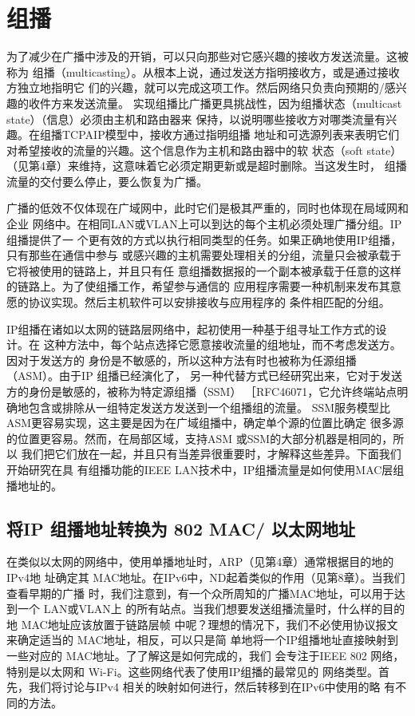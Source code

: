 \section{组播}
为了减少在广播中涉及的开销，可以只向那些对它感兴趣的接收方发送流量。这被称为
组播（multicasting）。从根本上说，通过发送方指明接收方，或是通过接收方独立地指明它
们的兴趣，就可以完成这项工作。然后网络只负责向预期的/感兴趣的收件方来发送流量。
实现组播比广播更具挑战性，因为组播状态（multicast state）（信息）必须由主机和路由器来
保持，以说明哪些接收方对哪类流量有兴趣。在组播TCPAIP模型中，接收方通过指明组播
地址和可选源列表来表明它们对希望接收的流量的兴趣。这个信息作为主机和路由器中的软
状态（soft state）（见第4章）来维持，这意味着它必须定期更新或是超时删除。当这发生时，
组播流量的交付要么停止，要么恢复为广播。

广播的低效不仅体现在广域网中，此时它们是极其严重的，同时也体现在局域网和企业
网络中。在相同LAN或VLAN上可以到达的每个主机必须处理广播分组。IP 组播提供了一
个更有效的方式以执行相同类型的任务。如果正确地使用IP组播，只有那些在通信中参与
或感兴趣的主机需要处理相关的分组，流量只会被承载于它将被使用的链路上，并且只有任
意组播数据报的一个副本被承载于任意的这样的链路上。为了使组播工作，希望参与通信的
应用程序需要一种机制来发布其意愿的协议实现。然后主机软件可以安排接收与应用程序的
条件相匹配的分组。

IP组播在诸如以太网的链路层网络中，起初使用一种基于组寻址工作方式的设计。在
这种方法中，每个站点选择它愿意接收流量的组地址，而不考虑发送方。因对于发送方的
身份是不敏感的，所以这种方法有时也被称为任源组播（ASM）。由于IP 组播已经演化了，
另一种代替方式已经研究出来，它对于发送方的身份是敏感的，被称为特定源组播（SSM）
［RFC46071，它允许终端站点明确地包含或排除从一组特定发送方发送到一个组播组的流量。
SSM服务模型比 ASM更容易实现，这主要是因为在广域组播中，确定单个源的位置比确定
很多源的位置更容易。然而，在局部区域，支持ASM 或SSM的大部分机器是相同的，所以
我们把它们放在一起，并且只有当差异很重要时，才解释这些差异。下面我们开始研究在具
有组播功能的IEEE LAN技术中，IP组播流量是如何使用MAC层组播地址的。

\subsection{将IP 组播地址转换为 802 MAC/ 以太网地址}

在类似以太网的网络中，使用单播地址时，ARP（见第4章）通常根据目的地的IPv4地
址确定其 MAC地址。在IPv6中，ND起着类似的作用（见第8章）。当我们查看早期的广播
时，我们注意到，有一个众所周知的广播MAC地址，可以用于达到一个 LAN或VLAN上
的所有站点。当我们想要发送组播流量时，什么样的目的地 MAC地址应该放置于链路层帧
中呢？理想的情况下，我们不必使用协议报文来确定适当的 MAC地址，相反，可以只是简
单地将一个IP组播地址直接映射到一些对应的 MAC地址。了了解这是如何完成的，我们
会专注于IEEE 802 网络，特别是以太网和 Wi-Fi。这些网络代表了使用IP组播的最常见的
网络类型。首先，我们将讨论与IPv4 相关的映射如何进行，然后转移到在IPv6中使用的略
有不同的方法。

